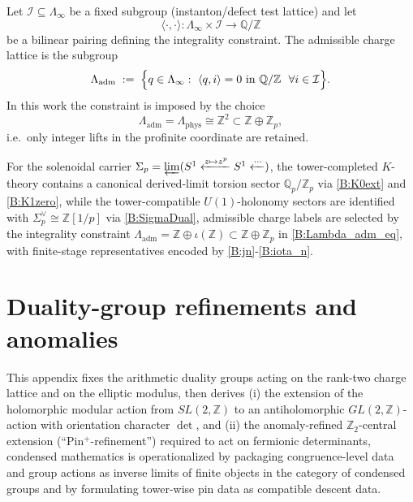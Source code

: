 \documentclass[11pt]{article}
\theoremstyle{remark}
\begin{document}
Let $\mathcal{I}\subseteq \Lambda_\infty$ be a fixed subgroup (instanton/defect test lattice) and let
\begin{equation}
\langle\cdot,\cdot\rangle:\Lambda_\infty\times \mathcal{I}\to \mathbb{Q}/\mathbb{Z}
\label{B:pairing}
\end{equation}
be a bilinear pairing defining the integrality constraint. The admissible charge lattice is the subgroup
\begin{equation}
\Lambda_{\mathrm{adm}}
\;:=\;
\Bigl\{q\in \Lambda_\infty:\ \langle q,i\rangle=0\ \text{in }\mathbb{Q}/\mathbb{Z}\ \ \forall i\in\mathcal{I}\Bigr\}.
\label{B:Lambda_adm}
\end{equation}
In this work the constraint is imposed by the choice
\begin{equation}
\Lambda_{\mathrm{adm}}=\Lambda_{\mathrm{phys}}\cong \mathbb{Z}^{2}\subset \mathbb{Z}\oplus \mathbb{Z}_{p},
\label{B:Lambda_adm_eq}
\end{equation}
i.e.\ only integer lifts in the profinite coordinate are retained.

For the solenoidal carrier $\Sigma_p=\varprojlim(S^1\xleftarrow{z\mapsto z^p}S^1\xleftarrow{\cdots})$, the tower-completed $K$-theory contains a canonical derived-limit torsion sector $\mathbb{Q}_p/\mathbb{Z}_p$ via \eqref{B:K0ext} and \eqref{B:K1zero}, while the tower-compatible $U(1)$-holonomy sectors are identified with $\Sigma_p^\vee\cong \mathbb{Z}[1/p]$ via \eqref{B:SigmaDual}, admissible charge labels are selected by the integrality constraint $\Lambda_{\mathrm{adm}}=\mathbb{Z}\oplus\iota(\mathbb{Z})\subset \mathbb{Z}\oplus\mathbb{Z}_p$ in \eqref{B:Lambda_adm_eq}, with finite-stage representatives encoded by \eqref{B:jn}-\eqref{B:iota_n}.


\section{Duality-group refinements and anomalies}
\label{app:duality-anomaly}

This appendix fixes the arithmetic duality groups acting on the rank-two charge lattice and on the elliptic modulus, then derives (i) the extension of the holomorphic modular action from $SL(2,\mathbb Z)$ to an antiholomorphic $GL(2,\mathbb Z)$-action with orientation character $\det$, and (ii) the anomaly-refined $\mathbb Z_{2}$-central extension (``Pin$^{+}$-refinement'') required to act on fermionic determinants, condensed mathematics is operationalized by packaging congruence-level data and group actions as inverse limits of finite objects in the category of condensed groups and by formulating tower-wise pin data as compatible descent data.
\end{document}
